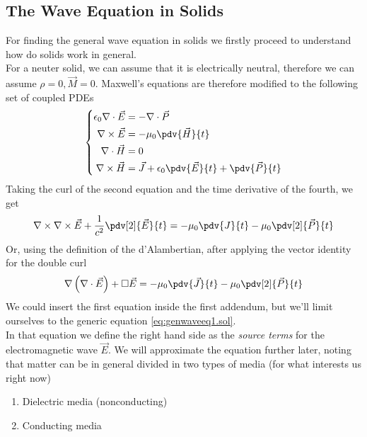 \documentclass[../electromagnetism.tex]{subfiles}
\begin{document}
\subsection{The Wave Equation in Solids}
For finding the general wave equation in solids we firstly proceed to understand how do solids work in general.\\
For a neuter solid, we can assume that it is electrically neutral, therefore we can assume $\rho=0, \vec{M}=0$. Maxwell's equations are therefore modified to the following set of coupled PDEs
\begin{equation}
	\left\{\begin{aligned}
			\epsilon_0\nabla\cdot\vec{E}&= -\nabla\cdot\vec{P}\\
			\nabla\times\vec{E}&= -\mu_0\pdv{\vec{H}}{t}\\
			\nabla\cdot\vec{H}&= 0\\
			\nabla\times\vec{H}&= \vec{J}+\epsilon_0\pdv{\vec{E}}{t}+\pdv{\vec{P}}{t}
	\end{aligned}\right.
	\label{eq:mwelectricallyneutral.sol}
\end{equation}
Taking the curl of the second equation and the time derivative of the fourth, we get
\begin{equation}
	\nabla\times\nabla\times\vec{E}+\frac{1}{c^2}\pdv[2]{\vec{E}}{t}=-\mu_0\pdv{J}{t}-\mu_0\pdv[2]{\vec{P}}{t}
	\label{eq:genwaveeq1.sol}
\end{equation}
Or, using the definition of the d'Alambertian, after applying the vector identity for the double curl
\begin{equation*}
	\nabla\left( \nabla\cdot\vec{E} \right)+\square\vec{E}=-\mu_0\pdv{\vec{J}}{t}-\mu_0\pdv[2]{\vec{P}}{t}
\end{equation*}
We could insert the first equation inside the first addendum, but we'll limit ourselves to the generic equation \eqref{eq:genwaveeq1.sol}.\\
In that equation we define the right hand side as the \textit{source terms} for the electromagnetic wave $\vec{E}$. We will approximate the equation further later, noting that matter can be in general divided in two types of media (for what interests us right now)
\begin{enumerate}
\item Dielectric media (nonconducting)
\item Conducting media
\end{enumerate}
\end{document}
